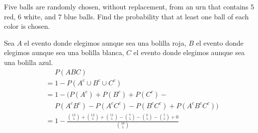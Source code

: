 \item  Five balls are randomly chosen, without replacement, from an urn that contains 5 red, 6 white, and 7 blue balls.
Find the probability that at least one ball of each color is chosen.

Sea $A$ el evento donde elegimos aunque sea una bolilla roja, $B$ el evento donde elegimos aunque sea una bolilla blanca, $C$ el evento donde elegimos aunque sea una bolilla azul.
\begin{align*}
    &\phantom{{}={}} P(ABC)\\
    &= 1 - P(A^c\cup B^c\cup C^c)\\
    &= 1 - \Big( P(A^c) + P(B^c) + P(C^c) - {}\\
    &\phantom{{}={}} P(A^cB^c) - P(A^cC^c) - P(B^cC^c) + P(A^c B^c C^c) \Big )\\
    &= 1 - 
    \frac{\binom{13}{5} + \binom{12}{5} + \binom{11}{5} - \binom{7}{5} - \binom{6}{5} - \binom{5}{5} + 0}{\binom{18}{5}}\\
\end{align*}